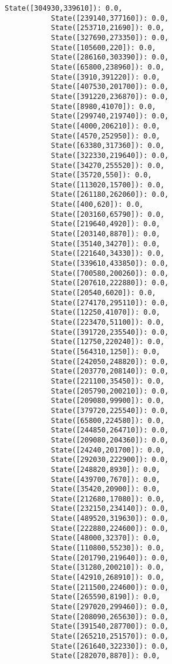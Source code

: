 \documentclass[11pt]{article}
\begin{document}
\begin{Verbatim}[commandchars=\\\{\}]
           State([304930,339610]): 0.0,
           State([239140,377160]): 0.0,
           State([253710,21690]): 0.0,
           State([327690,273350]): 0.0,
           State([105600,220]): 0.0,
           State([286160,303390]): 0.0,
           State([65800,238960]): 0.0,
           State([3910,391220]): 0.0,
           State([407530,201700]): 0.0,
           State([391220,236870]): 0.0,
           State([8980,41070]): 0.0,
           State([299740,219740]): 0.0,
           State([4000,206210]): 0.0,
           State([4570,252950]): 0.0,
           State([63380,317360]): 0.0,
           State([322330,219640]): 0.0,
           State([34270,255520]): 0.0,
           State([35720,550]): 0.0,
           State([113020,15700]): 0.0,
           State([261180,262060]): 0.0,
           State([400,620]): 0.0,
           State([203160,65790]): 0.0,
           State([219640,4920]): 0.0,
           State([203140,8870]): 0.0,
           State([35140,34270]): 0.0,
           State([221640,34330]): 0.0,
           State([339610,433850]): 0.0,
           State([700580,200260]): 0.0,
           State([207610,222880]): 0.0,
           State([20540,6020]): 0.0,
           State([274170,295110]): 0.0,
           State([12250,41070]): 0.0,
           State([223470,51100]): 0.0,
           State([391720,235540]): 0.0,
           State([12750,220240]): 0.0,
           State([564310,1250]): 0.0,
           State([242050,248820]): 0.0,
           State([203770,208140]): 0.0,
           State([221100,35450]): 0.0,
           State([205790,200210]): 0.0,
           State([209080,99900]): 0.0,
           State([379720,225540]): 0.0,
           State([65800,224580]): 0.0,
           State([244850,264710]): 0.0,
           State([209080,204360]): 0.0,
           State([24240,201700]): 0.0,
           State([292030,222900]): 0.0,
           State([248820,8930]): 0.0,
           State([439700,7670]): 0.0,
           State([35420,20900]): 0.0,
           State([212680,17080]): 0.0,
           State([232150,234140]): 0.0,
           State([489520,319630]): 0.0,
           State([222880,224600]): 0.0,
           State([48000,32370]): 0.0,
           State([110800,55230]): 0.0,
           State([201790,219640]): 0.0,
           State([31280,200210]): 0.0,
           State([42910,268910]): 0.0,
           State([211500,224600]): 0.0,
           State([265590,8190]): 0.0,
           State([297020,299460]): 0.0,
           State([208090,265630]): 0.0,
           State([391540,287700]): 0.0,
           State([265210,251570]): 0.0,
           State([261640,322330]): 0.0,
           State([282070,8870]): 0.0,

\end{Verbatim}
\end{document}
